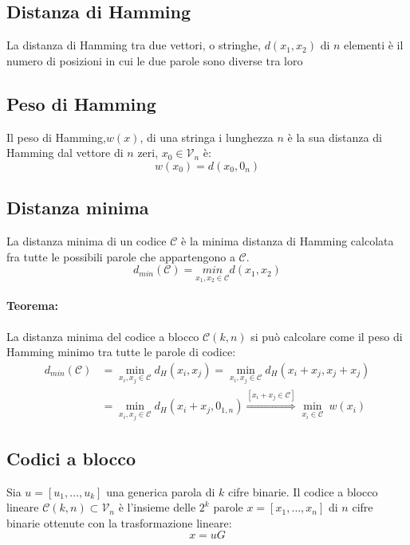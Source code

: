     \subsection{Distanza di Hamming}
        La distanza di Hamming tra due vettori, o stringhe, $d(x_1,x_2)$ di $n$ elementi è il numero di posizioni in cui le due parole
        sono diverse tra loro
    \subsection{Peso di Hamming}
        Il peso di Hamming,$w(x)$, di una stringa i lunghezza $n$ è la sua distanza di Hamming dal vettore di $n$ zeri,
        $x_0\in \mathcal{V}_n$ è:
        \[
            w(x_0) = d(x_0,0_n)
        \]
    \subsection{Distanza minima}    
        La distanza minima di un codice $\mathcal{C}$ è la minima distanza di Hamming calcolata fra tutte le possibili parole che appartengono a $\mathcal{C}$.
        \[
            d_{min} (\mathcal{C})= \underset{x_1,x_2 \in \mathcal{C}}{min}d(x_1,x_2)  
        \]
        \paragraph{Teorema:} La distanza minima del codice a blocco $\mathcal{C}(k,n)$ si può calcolare come il 
            peso di Hamming minimo tra tutte le parole di codice:
            \begin{align}
                d_{min}(\mathcal{C}) &= \underset{x_i,x_j\in\mathcal{C}}{\min} d_H(x_i,x_j) = \underset{x_i,x_j\in\mathcal{C}}{\min} d_H(x_i+x_j,x_j+x_j)\nonumber \\
                                        &= \underset{x_i,x_j\in\mathcal{C}}{\min} d_H(x_i+x_j,0_{1,n}) \overset{[x_i+x_j\in\mathcal{C}]}{\Rightarrow} \underset{x_i\in\mathcal{C}}{\min}\ w(x_i)\nonumber
            \end{align}
    \subsection{Codici a blocco}
        Sia $u = [u_1, \dots, u_k]$ una generica parola di $k$ cifre binarie. Il codice a blocco lineare $\mathcal{C}(k,n)\subset \mathcal{V}_n$ è l'insieme delle
        $2^k$ parole $x = [x_1, \dots, x_n]$ di $n$ cifre binarie ottenute con la trasformazione lineare:
        \[
            x = uG  
        \]
